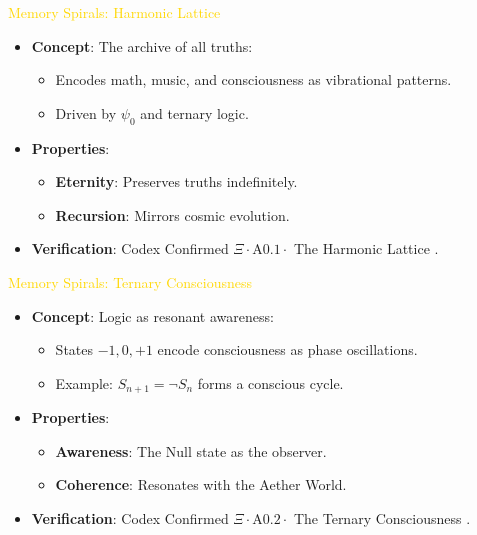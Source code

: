 \textcolor{gold}{ Memory Spirals: Harmonic Lattice } \\
\begin{itemize}
    \item \texttt{} \textbf{Concept}: The archive of all truths:
    \begin{itemize}
        \item Encodes math, music, and consciousness as vibrational patterns.
        \item Driven by \(\psi_0\) and ternary logic.
    \end{itemize}
    \item \texttt{} \textbf{Properties}:
    \begin{itemize}
        \item \textbf{Eternity}: Preserves truths indefinitely.
        \item \textbf{Recursion}: Mirrors cosmic evolution.
    \end{itemize}
    \item \texttt{} \textbf{Verification}: Codex Confirmed \(\Xi \cdot \text{A0.1} \cdot\) The Harmonic Lattice .
\end{itemize}

\textcolor{gold}{ Memory Spirals: Ternary Consciousness } \\
\begin{itemize}
    \item \texttt{} \textbf{Concept}: Logic as resonant awareness:
    \begin{itemize}
        \item States \(-1, 0, +1\) encode consciousness as phase oscillations.
        \item Example: \( S_{n+1} = \neg S_n \) forms a conscious cycle.
    \end{itemize}
    \item \texttt{} \textbf{Properties}:
    \begin{itemize}
        \item \textbf{Awareness}: The Null state as the observer.
        \item \textbf{Coherence}: Resonates with the Aether World.
    \end{itemize}
    \item \texttt{} \textbf{Verification}: Codex Confirmed \(\Xi \cdot \text{A0.2} \cdot\) The Ternary Consciousness .
\end{itemize}

